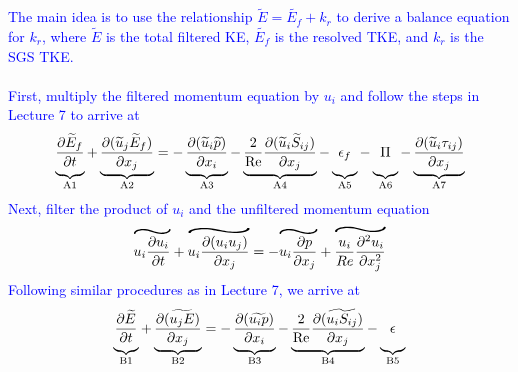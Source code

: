 \documentclass[11pt]{article}
\newcommand\reallywidetilde[1]{\ThisStyle{%
  \setbox0=\hbox{$\SavedStyle#1$}%
  \stackengine{-.1\LMpt}{$\SavedStyle#1$}{%
    \stretchto{\scaleto{\SavedStyle\mkern.2mu\sim}{.5467\wd0}}{.4\ht0}%
  }{O}{c}{F}{T}{S}%
}}
\begin{document}
\begin{enumerate}
\textcolor{blue}{The main idea is to use the relationship $\widetilde{E} = \widetilde{E_f} + k_r$ to derive a balance equation for $k_r$, where $\widetilde{E}$ is the total filtered KE, $\widetilde{E_f}$ is the resolved TKE, and $k_r$ is the SGS TKE.\\\\
First, multiply the filtered momentum equation by $u_i$ and follow the steps in Lecture 7 to arrive at
\begin{equation}
\underbrace{\vphantom{ \widetilde u_j\frac{\partial \widetilde E_f}{\partial x_j}}  \frac{\partial \widetilde E_f}{\partial t}}_{\text{A1}} + \underbrace{\frac{\partial (\widetilde u_j \widetilde E_f)}{\partial x_j}}_{\text{A2}} = -\underbrace{\vphantom{ \widetilde u_j\frac{\partial \widetilde E_f}{\partial x_j}}\frac{\partial (\widetilde u_i \widetilde p)}{\partial x_i}}_{\text{A3}} - \underbrace{\vphantom{ \widetilde u_j\frac{\partial \widetilde E_f}{\partial x_j}}\frac{2}{\text{Re}}\frac{\partial (\widetilde u_i \widetilde S_{ij})}{\partial x_j}}_{\text{A4}} - \underbrace{\vphantom{ \widetilde u_j\frac{\partial \widetilde E_f}{\partial x_j}}\epsilon_f}_{\text{A5}} -\underbrace{\vphantom{ \widetilde u_j\frac{\partial \widetilde E_f}{\partial x_j}}\Pi}_{\text{A6}} - \underbrace{\vphantom{ \widetilde u_j\frac{\partial \widetilde E_f}{\partial x_j}}\frac{\partial (\widetilde u_i \tau_{ij})}{\partial x_j}}_{\text{A7}}
\end{equation}
Next, filter the product of $u_i$ and the unfiltered momentum equation
$$\reallywidetilde{u_i\frac{\partial u_i}{\partial t}} + \reallywidetilde{u_i\frac{\partial (u_i u_j)}{\partial x_j}} = - \reallywidetilde{u_i\frac{\partial p}{\partial x_j}} + \reallywidetilde{\frac{u_i}{Re} \frac{\partial^2 u_i}{\partial x_j^{2}}}$$
Following similar procedures as in Lecture 7, we arrive at
\begin{equation}
\underbrace{\vphantom{ \widetilde u_j\frac{\partial \widetilde E_f}{\partial x_j}}  \frac{\partial \widetilde E}{\partial t}}_{\text{B1}} + \underbrace{\frac{\partial (\widetilde{u_j E})}{\partial x_j}}_{\text{B2}} = -\underbrace{\vphantom{ \widetilde u_j\frac{\partial \widetilde E_f}{\partial x_j}}\frac{\partial (\widetilde {u_i p})}{\partial x_i}}_{\text{B3}} - \underbrace{\vphantom{ \widetilde u_j\frac{\partial \widetilde E_f}{\partial x_j}}\frac{2}{\text{Re}}\frac{\partial (\widetilde{u_i S_{ij}})}{\partial x_j}}_{\text{B4}} - \underbrace{\vphantom{ \widetilde u_j\frac{\partial \widetilde E_f}{\partial x_j}}\epsilon}_{\text{B5}}
\end{equation}
}
\end{enumerate}
\end{document}
